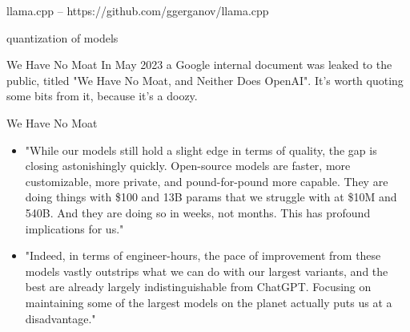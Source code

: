 \documentclass{beamer}
\begin{document}
\begin{frame}[plain]
\end{frame}


\begin{frame}
	llama.cpp -- https://github.com/ggerganov/llama.cpp
\end{frame}

\begin{frame}{quantization of models}
\end{frame}

\begin{frame}{We Have No Moat}
	In May 2023 a Google internal document was leaked to the public, titled "We Have No Moat, and Neither Does OpenAI". It's worth quoting some bits from it, because it's a doozy.
\end{frame}

\begin{frame}{We Have No Moat}
	\begin{itemize}
		\item "While our models still hold a slight edge in terms of quality, the gap is closing astonishingly quickly. Open-source models are faster, more customizable, more private, and pound-for-pound more capable. They are doing things with \$100 and 13B params that we struggle with at \$10M and 540B. And they are doing so in weeks, not months. This has profound implications for us."
		\pause
		\item "Indeed, in terms of engineer-hours, the pace of improvement from these models vastly outstrips what we can do with our largest variants, and the best are already largely indistinguishable from ChatGPT. Focusing on maintaining some of the largest models on the planet actually puts us at a disadvantage."
	\end{itemize}
\end{frame}
\end{document}
